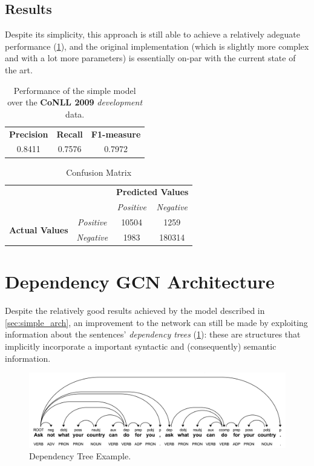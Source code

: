 \documentclass[a4paper,10pt,twocolumn]{article}
\begin{document}
\subsection{Results}
Despite its  simplicity,  this approach is still able to achieve a relatively adeguate performance (\cref{tab:simple_perf}), and the original  implementation \cite{simple}  (which is slightly more complex and with a lot more parameters) is essentially on-par with the current state of the art. 

\begin{table}[h!]
\centering
\begin{tabular}{|c|c|c|}
\hline\hline
 \textbf{Precision} & \textbf{Recall}&\textbf{F1-measure}\\
 0.8411 & 0.7576&0.7972\\
\hline\hline
\end{tabular}
\caption{Performance of the simple model over the \textbf{CoNLL 2009} \emph{development} data.}
\label{tab:simple_perf}
\end{table}
\begin{table}[h!]
	\centering
	\begin{tabular}{cccc}
	&&\multicolumn{2}{c}{\textbf{Predicted Values}}\\
	& &\textit{Positive}&\textit{Negative}\\\cline{3-4}	
	\multirow{2}{1.1cm}{\textbf{Actual Values}} 
	& \textit{Positive}  &\multicolumn{1}{|c|}{10504} & \multicolumn{1}{|c|}{1259}\\\cline{3-4}
	& \textit{Negative} & \multicolumn{1}{|c|}{1983} & \multicolumn{1}{|c|}{180314}\\\cline{3-4}
	\end{tabular}
	\caption{Confusion Matrix}
\end{table}


\section{Dependency GCN Architecture}
\label{sec:gcn_arch}
Despite the relatively good results achieved by the model described in \cref{sec:simple_arch}, an improvement to the network can still be made by exploiting information about the sentences' \emph{dependency  trees} (\cref{fig:dep_tree}): these are structures that implicitly incorporate a important syntactic and (consequently) semantic information.
\begin{figure}[h]
\caption{Dependency Tree Example.}
\label{fig:dep_tree}
\centering
\includegraphics[width=.48\textwidth]{dep_tree.png}
\end{figure}
\end{document}
